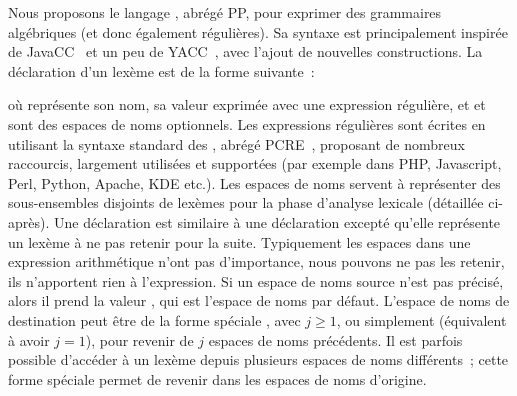 Nous proposons le langage , abrégé PP, pour exprimer des
grammaires algébriques (et donc également régulières). Sa syntaxe est
principalement inspirée de JavaCC~ et un peu de
YACC~, avec l'ajout de nouvelles constructions. La déclaration
d'un lexème est de la forme suivante~:
%
\begin{pre}
\end{pre}
%
où  représente son nom,  sa valeur exprimée avec une
expression régulière, et  et  sont des espaces
de noms optionnels. Les expressions régulières sont écrites en utilisant la
syntaxe standard des , abrégé
PCRE~, proposant de nombreux raccourcis, largement utilisées et
supportées (par exemple dans PHP, Javascript, Perl, Python, Apache, KDE etc.).
Les espaces de noms servent à représenter des sous-ensembles disjoints de
lexèmes pour la phase d'analyse lexicale (détaillée ci-après). Une déclaration
 est similaire à une déclaration  excepté qu'elle
représente un lexème à ne pas retenir pour la suite. Typiquement les espaces
dans une expression arithmétique n'ont pas d'importance, nous pouvons ne pas les
retenir, ils n'apportent rien à l'expression. Si un espace de noms source n'est
pas précisé, alors il prend la valeur , qui est l'espace de noms
par défaut. L'espace de noms de destination peut être de la forme spéciale
, avec $j \geq 1$, ou simplement 
(équivalent à avoir $j = 1$), pour revenir de $j$ espaces de noms précédents. Il
est parfois possible d'accéder à un lexème depuis plusieurs espaces de noms
différents~; cette forme spéciale permet de revenir dans les espaces de noms
d'origine. \\

